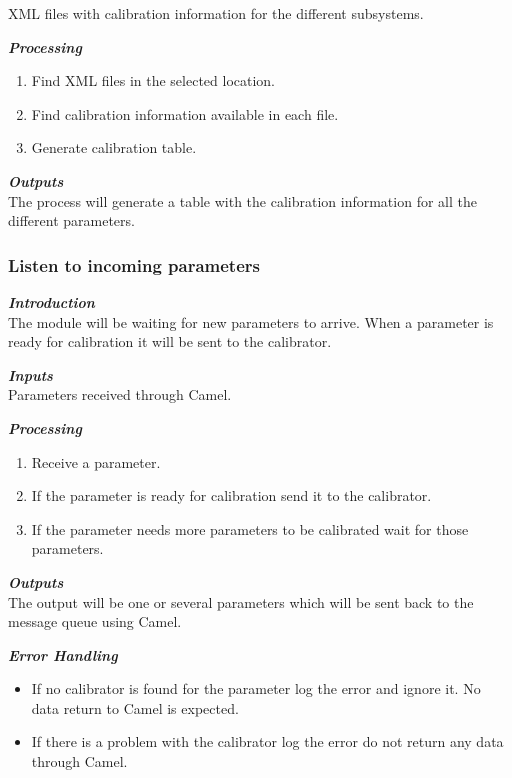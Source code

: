 XML files with calibration information for the different subsystems.

\textbf{\emph{Processing}}\\
\begin{enumerate}
\item Find XML files in the selected location.
\item Find calibration information available in each file.
\item Generate calibration table.
\end{enumerate}

\textbf{\emph{Outputs}}\\

The process will generate a table with the calibration information for all the different parameters.




\subsubsection{Listen to incoming parameters}

\textbf{\emph{Introduction}}\\
The module will be waiting for new parameters to arrive. When a parameter is ready for calibration it will be sent to the calibrator.

\textbf{\emph{Inputs}}\\

Parameters received through Camel.

\textbf{\emph{Processing}}\\
\begin{enumerate}
\item Receive a parameter.
\item If the parameter is ready for calibration send it to the calibrator.
\item If the parameter needs more parameters to be calibrated wait for those parameters.
\end{enumerate}

\textbf{\emph{Outputs}}\\

The output will be one or several parameters which will be sent back to the message queue using Camel.


\textbf{\emph{Error Handling}}\\
\begin{itemize}
\item If no calibrator is found for the parameter log the error and ignore it. No data return to Camel is expected.
\item If there is a problem with the calibrator log the error do not return any data through Camel.
\end{itemize}


